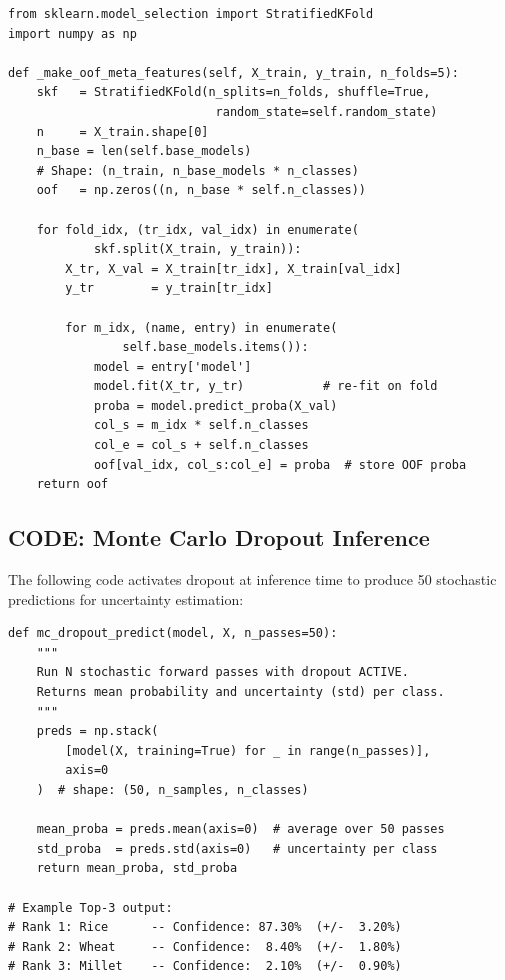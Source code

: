 \documentclass[12pt,a4paper,oneside]{report}
\begin{document}
\begin{singlespacing}
\begin{lstlisting}[caption={models/stacked\_ensemble.py --- OOF Meta-Feature Construction}]
from sklearn.model_selection import StratifiedKFold
import numpy as np

def _make_oof_meta_features(self, X_train, y_train, n_folds=5):
    skf   = StratifiedKFold(n_splits=n_folds, shuffle=True,
                             random_state=self.random_state)
    n     = X_train.shape[0]
    n_base = len(self.base_models)
    # Shape: (n_train, n_base_models * n_classes)
    oof   = np.zeros((n, n_base * self.n_classes))

    for fold_idx, (tr_idx, val_idx) in enumerate(
            skf.split(X_train, y_train)):
        X_tr, X_val = X_train[tr_idx], X_train[val_idx]
        y_tr        = y_train[tr_idx]

        for m_idx, (name, entry) in enumerate(
                self.base_models.items()):
            model = entry['model']
            model.fit(X_tr, y_tr)           # re-fit on fold
            proba = model.predict_proba(X_val)
            col_s = m_idx * self.n_classes
            col_e = col_s + self.n_classes
            oof[val_idx, col_s:col_e] = proba  # store OOF proba
    return oof
\end{lstlisting}
\end{singlespacing}

\subsection{CODE: Monte Carlo Dropout Inference}

The following code activates dropout at inference time to produce 50 stochastic predictions for uncertainty estimation:

\begin{singlespacing}
\begin{lstlisting}[caption={models/deep\_models.py --- MC-Dropout Uncertainty (50 passes)}]
def mc_dropout_predict(model, X, n_passes=50):
    """
    Run N stochastic forward passes with dropout ACTIVE.
    Returns mean probability and uncertainty (std) per class.
    """
    preds = np.stack(
        [model(X, training=True) for _ in range(n_passes)],
        axis=0
    )  # shape: (50, n_samples, n_classes)

    mean_proba = preds.mean(axis=0)  # average over 50 passes
    std_proba  = preds.std(axis=0)   # uncertainty per class
    return mean_proba, std_proba

# Example Top-3 output:
# Rank 1: Rice      -- Confidence: 87.30%  (+/-  3.20%)
# Rank 2: Wheat     -- Confidence:  8.40%  (+/-  1.80%)
# Rank 3: Millet    -- Confidence:  2.10%  (+/-  0.90%)
\end{lstlisting}
\end{singlespacing}
\end{document}
